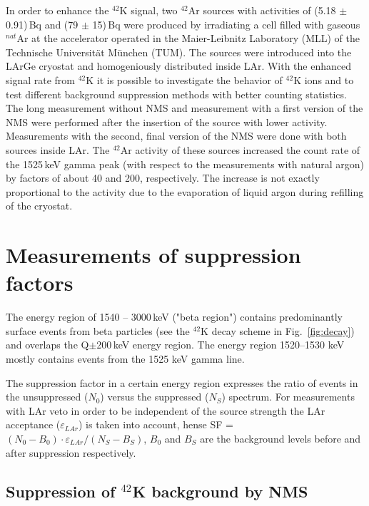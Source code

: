 \documentclass[twocolumn,epjc3]{svjour3}
\newcommand{\LArGe} {{{LArGe}\xspace}}
\newcommand{\I}[2]{$^{#1}$#2}
\newcommand{\tsb}{\textsubscript}
\begin{document}
In order to enhance the \I{42}{K} signal, two \I{42}{Ar} sources with activities of (5.18 $\pm$ 0.91)\,Bq and (79 $\pm$ 15)\,Bq were produced by irradiating a cell filled with gaseous \I{nat}{Ar} at the accelerator operated in the Maier-Leibnitz Laboratory (MLL) of the Technische Universit\"{a}t M\"{u}nchen (TUM). The sources were introduced into the \LArGe{} cryostat and homogeniously distributed inside LAr. With the enhanced signal rate from \I{42}{K} it is possible to investigate the behavior of \I{42}{K} ions and to test different background suppression methods with better counting statistics. The long measurement without NMS and measurement with a first version of the NMS were performed after the insertion of the source with lower activity. Measurements with the second, final version of the NMS were done with both sources inside LAr. The \I{42}{Ar} activity of these sources increased the count rate of the 1525\,keV gamma peak (with respect to the measurements with natural argon) by factors of about 40 and 200, respectively. The increase is not exactly proportional to the activity due to the evaporation of liquid argon during refilling of the cryostat. 
%

\section{Measurements of suppression factors}
\label{sec:res}
%
The energy region of 1540 -- 3000\,keV ("beta region") contains predominantly surface events from beta particles (see the \I{42}{K} decay scheme in Fig.~\ref{fig:decay}) and overlaps the Q\tsb{\textbeta\textbeta}$\pm$200\,keV energy region. The energy region 1520--1530 keV mostly contains events from the 1525 keV gamma line. 

The suppression factor in a certain energy region expresses the ratio of events in the unsuppressed ($N_{0}$) versus the suppressed ($N_{S}$) spectrum. For measurements with LAr veto in order to be independent of the source strength the LAr acceptance ($\varepsilon_{LAr}$) is taken into account, hense SF = $ (N_{0}-B_{0})\cdot \varepsilon_{LAr}/(N_{S}-B_{S})$, $B_{0}$ and $B_{S}$ are the background levels before and after suppression respectively. 
 
%
\subsection{Suppression of \I{42}{K} background by NMS}
\label{sec:suppr42K}
\end{document}
